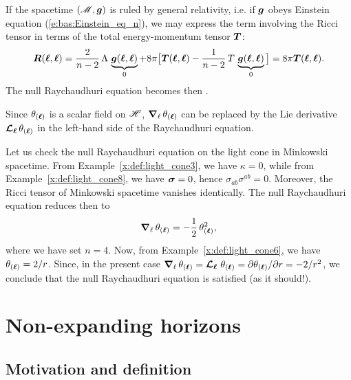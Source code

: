 {{If the spacetime $(\mathscr{M},\bm{g})$ is ruled by general relativity, i.e. if
$\bm{g}$ obeys Einstein equation (\ref{e:bas:Einstein_eq_n}), we may express
the term involving the Ricci tensor in terms of the total energy-momentum tensor
$\bm{T}$:
\[
  \bm{R}(\bm{\ell}, \bm{\ell})  = \frac{2}{n-2}\,\Lambda\,  \underbrace{\bm{g}(\bm{\ell}, \bm{\ell})}_{0}
    + 8\pi \big[ \bm{T}(\bm{\ell}, \bm{\ell}) - \frac{1}{n-2}\,  T \, \underbrace{\bm{g}(\bm{\ell}, \bm{\ell})}_{0} \big]
    = 8\pi \bm{T}(\bm{\ell}, \bm{\ell}) .
\]
The null Raychaudhuri equation becomes then
\be
    .
\ee

\begin{remark}
Since $\theta_{(\bm{\ell})}$ is a scalar field on $\mathscr{H}$, $\bm{\nabla}_{\ell}\,  \theta_{(\bm{\ell})}$
can be replaced by the Lie derivative $\bm{\mathcal{L}}_{\bm{\bm{\ell}}}\, \theta_{(\bm{\ell})}$ in the left-hand side of the Raychaudhuri
equation.
\end{remark}

\begin{example}
Let us check the null Raychaudhuri equation on the light cone in Minkowski
spacetime. From Example~\ref{x:def:light_cone3}, we have $\kappa=0$, while
from Example~\ref{x:def:light_cone8}, we have $\bm{\sigma}=0$,
hence $\sigma_{ab} \sigma^{ab}=0$. Moreover, the Ricci tensor of Minkowski
spacetime vanishes identically. The null Raychaudhuri equation reduces
then to
\[
    \bm{\nabla}_{\ell}\,  \theta_{(\bm{\ell})} =  - \frac{1}{2} \, \theta_{(\bm{\ell})}^2 ,
\]
where we have set $n=4$. Now, from Example~\ref{x:def:light_cone6}, we
have $\theta_{(\bm{\ell})} = 2/r$. Since, in the present case
$\bm{\nabla}_{\ell}\,  \theta_{(\bm{\ell})}  = \bm{\mathcal{L}}_{\bm{\ell}}\, \,  \theta_{(\bm{\ell})}  = {\partial \theta_{(\bm{\ell})}}/{\partial r} =
- 2/r^2$, we conclude that the null Raychaudhuri equation is satisfied (as
it should!).
\end{example}


\section{Non-expanding horizons}

\subsection{Motivation and definition}

}}
